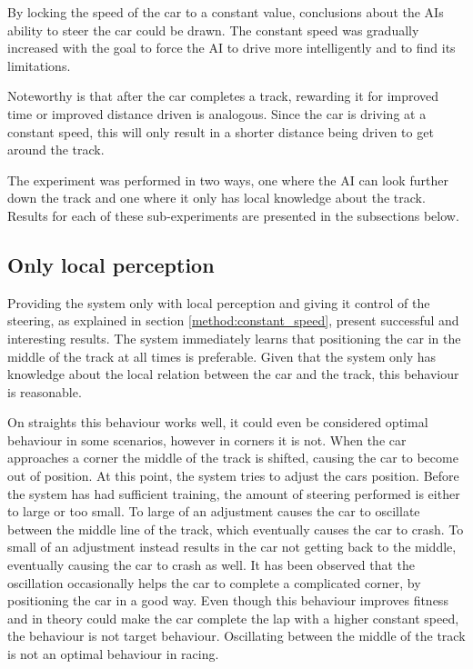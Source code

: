 By locking the speed of the car to a constant value, conclusions about the AIs ability to steer the car could be drawn. The constant speed was gradually increased with the goal to force the AI to drive more intelligently and to find its limitations. 

Noteworthy is that after the car completes a track, rewarding it for improved time or improved distance driven is analogous. Since the car is driving at a constant speed, this will only result in a shorter distance being driven to get around the track.

The experiment was performed in two ways, one where the AI can look further down the track and one where it only has local knowledge about the track. Results for each of these sub-experiments are presented in the subsections below.

\subsection{Only local perception}
Providing the system only with local perception and giving it control of the steering, as explained in section \ref{method:constant_speed}, present successful and interesting results. The system immediately learns that positioning the car in the middle of the track at all times is preferable. Given that the system only has knowledge about the local relation between the car and the track, this behaviour is reasonable.

On straights this behaviour works well, it could even be considered optimal behaviour in some scenarios, however in corners it is not. When the car approaches a corner the middle of the track is shifted, causing the car to become out of position. At this point, the system tries to adjust the cars position. Before the system has had sufficient training, the amount of steering performed is either to large or too small. To large of an adjustment causes the car to oscillate between the middle line of the track, which eventually causes the car to crash. To small of an adjustment instead results in the car not getting back to the middle, eventually causing the car to crash as well. It has been observed that the oscillation occasionally helps the car to complete a complicated corner, by positioning the car in a good way. Even though this behaviour improves fitness and in theory could make the car complete the lap with a higher constant speed, the behaviour is not target behaviour. Oscillating between the middle of the track is not an optimal behaviour in racing.

